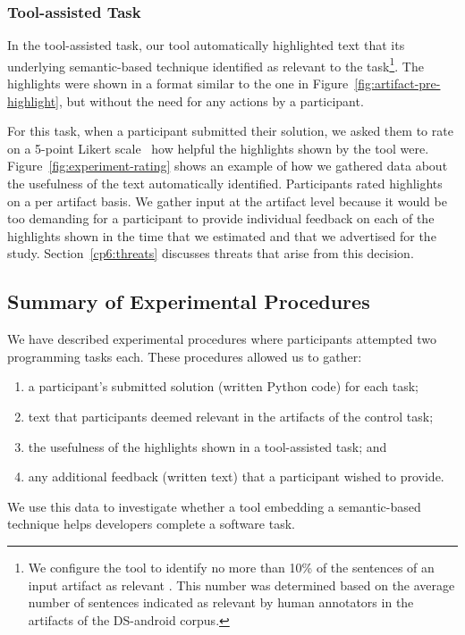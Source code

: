 \subsubsection{Tool-assisted Task}
\label{cp6:procedures-tool-assisted}


In the tool-assisted task, our tool automatically highlighted text that 
its underlying semantic-based technique identified as relevant to the task\footnote{
    We configure the tool to identify no more than 10\% of the sentences of an input artifact as relevant .
    This number was determined based on the average number of sentences indicated as relevant by human annotators in the artifacts of the \acs{DS-android} corpus.
}.
The highlights were shown in a format similar to the one in Figure~\ref{fig:artifact-pre-highlight}, but without the need for any actions by a participant.




For this task, when a participant submitted their solution, we asked them to 
rate on a 5-point Likert scale~\cite{likert1932technique} how helpful the highlights shown by the tool were.
Figure~\ref{fig:experiment-rating} shows an example of how we gathered data about the usefulness of the text automatically identified.
Participants rated highlights on a per artifact basis.
We gather input at the artifact level because it would be too demanding for a participant 
to provide individual feedback on each of the highlights shown
in the time that we estimated and that we advertised for the study.
Section~\ref{cp6:threats} discusses  threats that arise from this decision.







\subsection{Summary of Experimental Procedures}


We have described experimental procedures 
where participants attempted two programming tasks each.
These procedures allowed us to gather:


\begin{enumerate}
\item a participant's submitted solution (written Python code) for each task;
\item text that participants deemed relevant in the artifacts of the control task;
\item the usefulness of the highlights shown in a tool-assisted task; and
\item any additional feedback (written text) that a participant wished to provide.
\end{enumerate}


We use this data to investigate whether 
a tool embedding a semantic-based technique helps developers complete a software task. 




